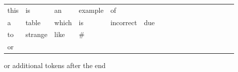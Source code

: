 \begin{tabular}{lllllllllllllllll}
  this & is & an & example & of \\
  a & table & which & is & incorrect & due \\
  to & strange & like & # & \\
  or & 

  & \\
\end{tabular} or additional tokens after the end

